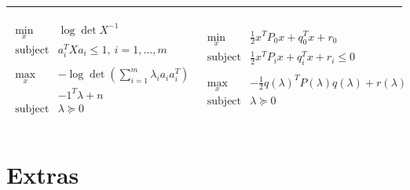 \documentclass[a4paper, 11pt, twocolumn, landscape]{article}
\theoremstyle{lemma-style}
\theoremstyle{thm-style}
\theoremstyle{prop-style}
\theoremstyle{cor-style}
\newcommand{\rline}{\vspace{0em}\noindent\rule{\textwidth}{1pt}\vspace{0em}}
\begin{document}
\begin{small}
\rline
\begin{equation*}
  \begin{array}{l|l}
    \begin{array}{ll}
      \underset{x}{\text{min}} & \log\det{X^{-1}}\\
      \text{subject to} & a_i^T X a_i \le 1,\ i = 1, \dots, m\\
                               & \\
      \underset{x}{\text{max}} & - \log \det(\sum_{i = 1}^m \lambda_i a_i a_i^T) \\
                               & - 1^T \lambda + n\\
      \text{subject to} & \lambda \succeq 0\\
    \end{array} &
                  \begin{array}{lll}
                    \underset{x}{\text{min}} & \frac{1}{2}x^T P_0 x + q_0^T x + r_0 &\\
                    \text{subject to} & \frac{1}{2}x^T P_i x + q_i^T x + r_i \le 0 & \\
                                             & & \\
                    \underset{x}{\text{max}} & - \frac{1}{2} q(\lambda)^T P(\lambda) q(\lambda) + r(\lambda) \\
                    \text{subject to} & \lambda \succeq 0\\
                  \end{array} \\
  \end{array}
\end{equation*}

\section{Extras}


\end{small}
\end{document}
